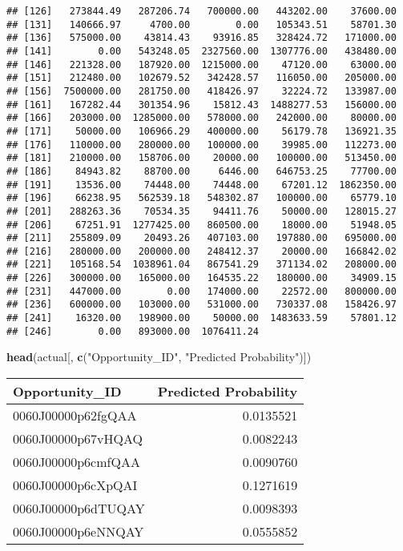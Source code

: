\documentclass[]{article}
\newenvironment{Shaded}{\begin{snugshade}}{\end{snugshade}}
\newcommand{\KeywordTok}[1]{\textcolor[rgb]{0.13,0.29,0.53}{\textbf{#1}}}
\newcommand{\NormalTok}[1]{#1}
\newcommand{\StringTok}[1]{\textcolor[rgb]{0.31,0.60,0.02}{#1}}
\begin{document}
\begin{verbatim}
## [126]   273844.49   287206.74   700000.00   443202.00    37600.00
## [131]   140666.97     4700.00        0.00   105343.51    58701.30
## [136]   575000.00    43814.43    93916.85   328424.72   171000.00
## [141]        0.00   543248.05  2327560.00  1307776.00   438480.00
## [146]   221328.00   187920.00  1215000.00    47120.00    63000.00
## [151]   212480.00   102679.52   342428.57   116050.00   205000.00
## [156]  7500000.00   281750.00   418426.97    32224.72   133987.00
## [161]   167282.44   301354.96    15812.43  1488277.53   156000.00
## [166]   203000.00  1285000.00   578000.00   242000.00    80000.00
## [171]    50000.00   106966.29   400000.00    56179.78   136921.35
## [176]   110000.00   280000.00   100000.00    39985.00   112273.00
## [181]   210000.00   158706.00    20000.00   100000.00   513450.00
## [186]    84943.82    88700.00     6446.00   646753.25    77700.00
## [191]    13536.00    74448.00    74448.00    67201.12  1862350.00
## [196]    66238.95   562539.18   548302.87   100000.00    65779.10
## [201]   288263.36    70534.35    94411.76    50000.00   128015.27
## [206]    67251.91  1277425.00   860500.00    18000.00    51948.05
## [211]   255809.09    20493.26   407103.00   197880.00   695000.00
## [216]   280000.00   200000.00   248412.37    20000.00   166842.02
## [221]   105168.54  1038961.04   867541.29   371134.02   208000.00
## [226]   300000.00   165000.00   164535.22   180000.00    34909.15
## [231]   447000.00        0.00   174000.00    22572.00   800000.00
## [236]   600000.00   103000.00   531000.00   730337.08   158426.97
## [241]    16320.00   198900.00    50000.00  1483633.59    57801.12
## [246]        0.00   893000.00  1076411.24
\end{verbatim}

\begin{Shaded}
\begin{Highlighting}[]
\KeywordTok{head}\NormalTok{(actual[, }\KeywordTok{c}\NormalTok{(}\StringTok{"Opportunity_ID"}\NormalTok{, }\StringTok{"Predicted Probability"}\NormalTok{)])}
\end{Highlighting}
\end{Shaded}

\begin{tabular}{l|r}
\hline
Opportunity\_ID & Predicted Probability\\
\hline
0060J00000p62fgQAA & 0.0135521\\
\hline
0060J00000p67vHQAQ & 0.0082243\\
\hline
0060J00000p6cmfQAA & 0.0090760\\
\hline
0060J00000p6cXpQAI & 0.1271619\\
\hline
0060J00000p6dTUQAY & 0.0098393\\
\hline
0060J00000p6eNNQAY & 0.0555852\\
\hline
\end{tabular}
\end{document}
